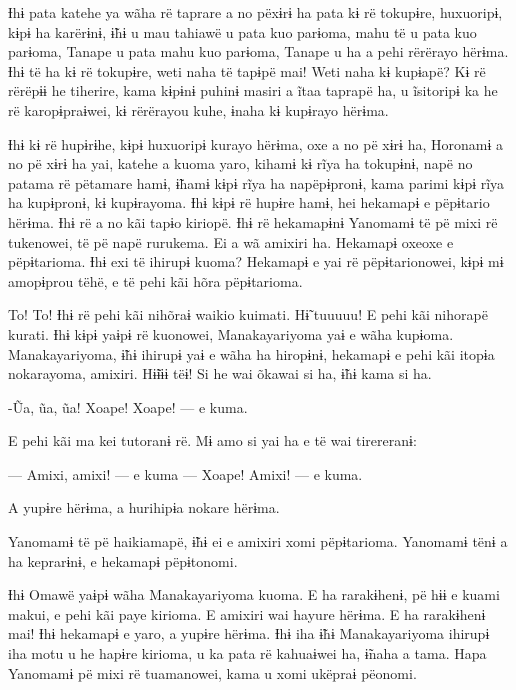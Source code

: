 
 

Ɨhɨ pata katehe ya wãha rë taprare a no pëxɨrɨ ha pata kɨ rë tokupɨre,
huxuoripɨ, kɨpɨ ha karërɨnɨ, ɨ̃hɨ u mau tahiawë u pata kuo parɨoma, mahu
të u pata kuo parɨoma, Tanape u pata mahu kuo parɨoma, Tanape u ha a
pehi rërërayo hërɨma. Ɨhɨ të ha kɨ rë tokupɨre, weti naha të tapɨpë mai!
Weti naha kɨ kupɨapë? Kɨ rë rërëpɨɨ he tiherire, kama kɨpɨnɨ puhinɨ
masiri a ĩtaa taprapë ha, u ĩsitoripɨ ka he rë karopɨpraɨwei, kɨ
rërërayou kuhe, ɨnaha kɨ kupɨrayo hërɨma. 

Ɨhɨ kɨ rë hupɨrɨhe, kɨpɨ huxuoripɨ kurayo hërɨma, oxe a no pë xɨrɨ ha,
Horonamɨ a no pë xɨrɨ ha yai, katehe a kuoma yaro, kihamɨ kɨ rĩya ha
tokupɨnɨ, napë no patama rë pëtamare hamɨ, ɨ̃hamɨ kɨpɨ rĩya ha
napëpɨpronɨ, kama parimi kɨpɨ rĩya ha kupɨpronɨ, kɨ kupɨrayoma. Ɨhɨ kɨpɨ
rë hupɨre hamɨ, hei hekamapɨ e pëpɨtario hërɨma. Ɨhɨ rë a no kãi tapɨo
kiriopë. Ɨhɨ rë hekamapɨnɨ Yanomamɨ të pë mixi rë tukenowei, të pë napë
rurukema. Ei a wã amixiri ha. Hekamapɨ oxeoxe e pëpɨtarioma. Ɨhɨ exi të
ihirupɨ kuoma? Hekamapɨ e yai rë pëpɨtarionowei, kɨpɨ mɨ amopɨprou tëhë,
e të pehi kãi hõra pëpɨtarioma. 

To! To! Ɨhɨ rë pehi kãi nihõraɨ waikio kuimati. Hɨ̃ tuuuuu! E pehi kãi
nihorapë kurati. Ɨhɨ kɨpɨ yaɨpɨ rë kuonowei, Manakayariyoma yaɨ e wãha
kupɨoma. Manakayariyoma, ɨ̃hɨ ihirupɨ yaɨ e wãha ha hiropɨnɨ, hekamapɨ e
pehi kãi itopɨa nokarayoma, amixiri. Hɨ̃ɨɨɨ tëɨ! Si he wai õkawai si ha,
ɨ̃hɨ kama si ha. 

-Ũa, ũa, ũa! Xoape! Xoape! --- e kuma. 

E pehi kãi ma kei tutoranɨ rë. Mɨ amo si yai ha e të wai tirereranɨ:

— Amixi, amixi! --- e kuma --- Xoape! Amixi! --- e kuma. 

A yupɨre hërɨma, a hurihipɨa nokare hërɨma. 

Yanomamɨ të pë haikiamapë, ɨ̃hɨ ei e amixiri xomi pëpɨtarioma. Yanomamɨ
tënɨ a ha keprarɨnɨ, e hekamapɨ pëpɨtonomi. 

Ɨhɨ Omawë yaɨpɨ wãha Manakayariyoma kuoma. E ha rarakɨhenɨ, pë hɨɨ e
kuami makui, e pehi kãi paye kirioma. E amixiri wai hayure hërɨma. E ha
rarakɨhenɨ mai! Ɨhɨ hekamapɨ e yaro, a yupɨre hërɨma. Ɨhɨ iha ɨ̃hɨ
Manakayariyoma ihirupɨ iha motu u he hapɨre kirioma, u ka pata rë
kahuaɨwei ha, ɨ̃naha a tama. Hapa Yanomamɨ pë mixi rë tuamanowei, kama u
xomi ukëpraɨ pëonomi. 

